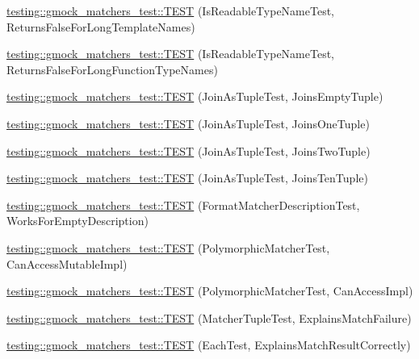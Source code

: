 \begin{DoxyCompactItemize}
\item 
\hyperlink{namespacetesting_1_1gmock__matchers__test_ad1630d47de9f4fcdc00ab4962eaeea05}{testing\+::gmock\+\_\+matchers\+\_\+test\+::\+T\+E\+ST} (Is\+Readable\+Type\+Name\+Test, Returns\+False\+For\+Long\+Template\+Names)
\item 
\hyperlink{namespacetesting_1_1gmock__matchers__test_a30516b1c70e14132d1d87ab08b96aa2f}{testing\+::gmock\+\_\+matchers\+\_\+test\+::\+T\+E\+ST} (Is\+Readable\+Type\+Name\+Test, Returns\+False\+For\+Long\+Function\+Type\+Names)
\item 
\hyperlink{namespacetesting_1_1gmock__matchers__test_aa633c0b7e0f0316c23bff10e9963f773}{testing\+::gmock\+\_\+matchers\+\_\+test\+::\+T\+E\+ST} (Join\+As\+Tuple\+Test, Joins\+Empty\+Tuple)
\item 
\hyperlink{namespacetesting_1_1gmock__matchers__test_acaec7fcf41bb1cdf7124b443e7ab28e8}{testing\+::gmock\+\_\+matchers\+\_\+test\+::\+T\+E\+ST} (Join\+As\+Tuple\+Test, Joins\+One\+Tuple)
\item 
\hyperlink{namespacetesting_1_1gmock__matchers__test_a0831a9160c5420fcd363e4a520f0fb61}{testing\+::gmock\+\_\+matchers\+\_\+test\+::\+T\+E\+ST} (Join\+As\+Tuple\+Test, Joins\+Two\+Tuple)
\item 
\hyperlink{namespacetesting_1_1gmock__matchers__test_a56811b12ff298040a3d44dba0a2e4a8e}{testing\+::gmock\+\_\+matchers\+\_\+test\+::\+T\+E\+ST} (Join\+As\+Tuple\+Test, Joins\+Ten\+Tuple)
\item 
\hyperlink{namespacetesting_1_1gmock__matchers__test_ae104f652fab7d1b3c3873f6987401481}{testing\+::gmock\+\_\+matchers\+\_\+test\+::\+T\+E\+ST} (Format\+Matcher\+Description\+Test, Works\+For\+Empty\+Description)
\item 
\hyperlink{namespacetesting_1_1gmock__matchers__test_ae29925e94a9396fe3c7fab6efaff8d8a}{testing\+::gmock\+\_\+matchers\+\_\+test\+::\+T\+E\+ST} (Polymorphic\+Matcher\+Test, Can\+Access\+Mutable\+Impl)
\item 
\hyperlink{namespacetesting_1_1gmock__matchers__test_a918a64c4594ef6b30f53d735c2e6e6ac}{testing\+::gmock\+\_\+matchers\+\_\+test\+::\+T\+E\+ST} (Polymorphic\+Matcher\+Test, Can\+Access\+Impl)
\item 
\hyperlink{namespacetesting_1_1gmock__matchers__test_abc9816afa3c83fc92e2c6ecfb2dd8e63}{testing\+::gmock\+\_\+matchers\+\_\+test\+::\+T\+E\+ST} (Matcher\+Tuple\+Test, Explains\+Match\+Failure)
\item 
\hyperlink{namespacetesting_1_1gmock__matchers__test_adf46df588332aa839b52af952fface1a}{testing\+::gmock\+\_\+matchers\+\_\+test\+::\+T\+E\+ST} (Each\+Test, Explains\+Match\+Result\+Correctly)

\end{DoxyCompactItemize}
